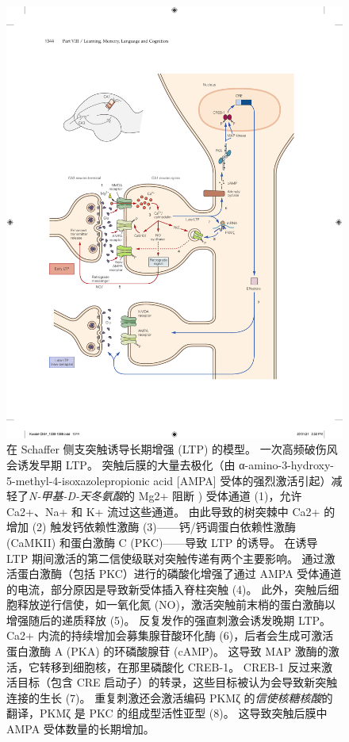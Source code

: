 \begin{figure}[htbp]
	\centering
	\includegraphics[width=0.9\linewidth]{chap54/fig_54_3}
	\caption{在 Schaffer 侧支突触诱导长期增强 (LTP) 的模型。 一次高频破伤风会诱发早期 LTP。 突触后膜的大量去极化（由 α-amino-3-hydroxy-5-methyl-4-isoxazolepropionic acid [AMPA] 受体的强烈激活引起）减轻了\textit{N-甲基-D-天冬氨酸}的 Mg2+ 阻断 ) 受体通道 (1)，允许 Ca2+、Na+ 和 K+ 流过这些通道。 由此导致的树突棘中 Ca2+ 的增加 (2) 触发钙依赖性激酶 (3)——钙/钙调蛋白依赖性激酶 (CaMKII) 和蛋白激酶 C (PKC)——导致 LTP 的诱导。 在诱导 LTP 期间激活的第二信使级联对突触传递有两个主要影响。 通过激活蛋白激酶（包括 PKC）进行的磷酸化增强了通过 AMPA 受体通道的电流，部分原因是导致新受体插入脊柱突触 (4)。 此外，突触后细胞释放逆行信使，如一氧化氮 (NO)，激活突触前末梢的蛋白激酶以增强随后的递质释放 (5)。 反复发作的强直刺激会诱发晚期 LTP。 Ca2+ 内流的持续增加会募集腺苷酸环化酶 (6)，后者会生成可激活蛋白激酶 A (PKA) 的环磷酸腺苷 (cAMP)。 这导致 MAP 激酶的激活，它转移到细胞核，在那里磷酸化 CREB-1。 CREB-1 反过来激活目标（包含 CRE 启动子）的转录，这些目标被认为会导致新突触连接的生长 (7)。 重复刺激还会激活编码 PKMζ 的\textit{信使核糖核酸}的翻译，PKMζ 是 PKC 的组成型活性亚型 (8)。 这导致突触后膜中 AMPA 受体数量的长期增加。}
	\label{fig:54_3}
\end{figure}


